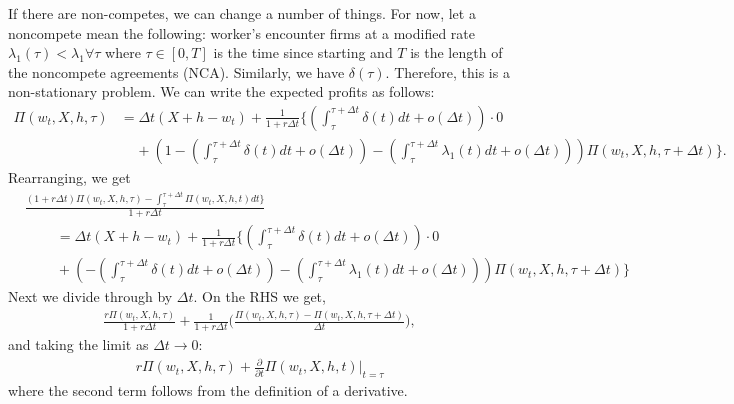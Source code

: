 \documentclass[11pt]{article}
\begin{document}
If there are non-competes, we can change a number of things. For now, let a
noncompete mean the following: worker's encounter firms at a modified rate
$\lambda_1(\tau) < \lambda_1 \forall \tau$ where $\tau \in [0,T]$ is the
time since starting and $T$ is the length of the
noncompete agreements (NCA). Similarly, we have $\delta(\tau)$. Therefore,
this is a non-stationary problem.  We can write the expected profits
as follows:
 \begin{align*}
     \Pi(w_t,X,h,\tau) &= \Delta t(X + h - w_t) + \frac{1}{1+r\Delta t} \{
         ( \textstyle\int_{\tau}^{\tau + \Delta t}  \delta(t) dt + o(\Delta t)) \cdot 0 \\
                       &\;\;\;\;+ (1-(\textstyle\int_{\tau}^{\tau+\Delta t}
                       \delta(t)dt + o(\Delta
                       t))-(\textstyle\int_{\tau}^{\tau + \Delta t}
                       \lambda_1(t)dt + o(\Delta t)))
                   \Pi(w_t,X,h,\tau + \Delta t)\}
.\end{align*}
Rearranging, we get
\begin{align*}
         &\frac{(1+ r \Delta t) \Pi(w_t,X,h,\tau) - 
                   \textstyle\int_{\tau}^{\tau + \Delta t} \Pi(w_t,X,h,t)dt\}
         }{1 + r \Delta t} \\
         &\;\;\;\;\;\;\;\; = \Delta t(X + h - w_t) + \frac{1}{1+r\Delta t} \{
         ( \textstyle\int_{\tau}^{\tau + \Delta t}  \delta(t) dt + o(\Delta t)) \cdot 0 \\
         &\;\;\;\;\;\;\;\;+ (-(\textstyle\int_{\tau}^{\tau+\Delta t}
                       \delta(t)dt + o(\Delta
                       t))-(\textstyle\int_{\tau}^{\tau + \Delta t}
                       \lambda_1(t)dt + o(\Delta t)))
                   \Pi(w_t,X,h,\tau + \Delta t)\}
\end{align*}
Next we divide through by $\Delta t$. On the RHS we get,
\begin{align*}
    \frac{r \Pi(w_t,X,h,\tau)}{1 + r \Delta t}
    + 
    \frac{1}{1 + r \Delta t}\Big (\frac{\Pi(w_t,X,h,\tau) -
    \Pi(w_t,X,h,\tau + \Delta t)}{\Delta t} \Big )
,\end{align*}
and taking the limit as $\Delta t \rightarrow 0$:
\begin{align*}
    r \Pi(w_t,X,h,\tau)
    + \frac{\partial}{\partial t} \Pi(w_t,X,h,t)\Big|_{t = \tau}
\end{align*}
where the second term follows from the definition of a derivative.
\end{document}
